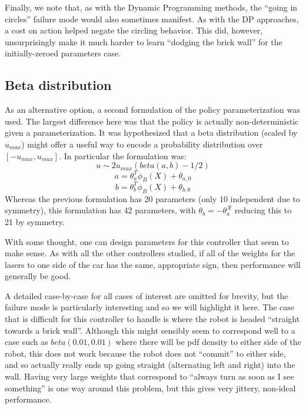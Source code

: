 \documentclass{article}
\begin{document}
Finally, we note that, as with the Dynamic Programming methods, the ``going in circles'' failure mode would also sometimes manifest.  As with the DP approaches, a cost on action helped negate the circling behavior.  This did, however, unsurprisingly make it much harder to learn ``dodging the brick wall'' for the initially-zeroed parameters case.

\subsection{Beta distribution}

As an alternative option, a second formulation of the policy parameterization was used.  The largest difference here was that the policy is actually non-deterministic given a parameterization.  It was hypothesized that a beta distribution (scaled by $u_{max}$) might offer a useful way to encode a probability distribution over $[-u_{max}, u_{max}]$.  In particular the formulation was:
%
%
\begin{equation}
u \sim 2u_{max}(beta(a,b) - 1/2)
\end{equation}
\begin{equation}
a = \theta_a^T \phi_B(X) + \theta_{a, 0}
\end{equation}
\begin{equation}
b = \theta_b^T \phi_B(X) + \theta_{b, 0}
\end{equation}
%
%
Whereas the previous formulation has 20 parameters (only 10 independent due to symmetry), this formulation has 42 parameters, with $\theta_b = -\theta_a^{\mathcal{R}}$ reducing this to 21 by symmetry.

With some thought, one can design parameters for this controller that seem to make sense.  As with all the other controllers studied, if all of the weights for the lasers to one side of the car has the same, appropriate sign, then performance will generally be good.  

A detailed case-by-case for all cases of interest are omitted for brevity, but the failure mode is particularly interesting and so we will highlight it here.  The case that is difficult for this controller to handle is where the robot is headed ``straight towards a brick wall''.  Although this might sensibly seem to correspond well to a case such as $beta(0.01, 0.01)$ where there will be pdf density to either side of the robot, this does not work because the robot does not ``commit'' to either side, and so actually really ends up going straight (alternating left and right) into the wall.  Having very large weights that correspond to ``always turn as soon as I see something'' is one way around this problem, but this gives very jittery, non-ideal performance.
\end{document}
